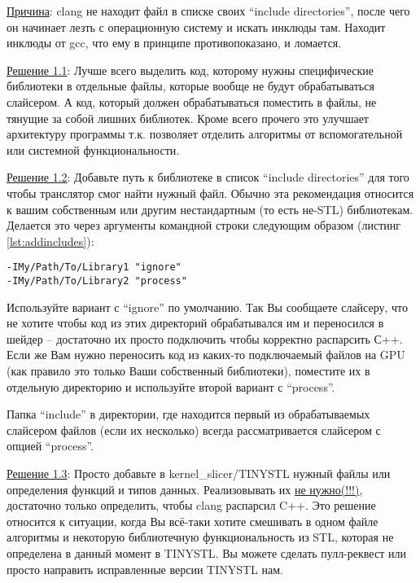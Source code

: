 \documentclass[11pt,fleqn,english,russian]{report} %
\begin{document}
\noindent\underline{Причина}: clang не находит файл в списке своих ``include directories'', после чего он начинает лезть с операционную систему и искать инклюды там. Находит инклюды от gcc, что ему в принципе противопоказано, и ломается. 

\vspace*{5px}
\noindent\underline{Решение 1.1}: Лучше всего выделить код, которому нужны специфические библиотеки в отдельные файлы, которые вообще не будут обрабатываться слайсером. А код, который должен обрабатываться поместить в файлы, не тянущие за собой лишних библиотек. Кроме всего прочего это улучшает архитектуру программы т.к. позволяет отделить алгоритмы от вспомогательной или системной функциональности.

\vspace*{5px}
\noindent\underline{Решение 1.2}: Добавьте путь к библиотеке в список ``include directories'' для того чтобы транслятор смог найти нужный файл. Обычно эта рекомендация относится к вашим собственным или другим нестандартным (то есть не-STL) библиотекам. Делается это через аргументы командной строки следующим образом (листинг \ref{lst:addincludes}):

\begin{lstlisting}[caption=добавляем новый подключаемый файл, 
	label=lst:addincludes]	
-IMy/Path/To/Library1 "ignore"
-IMy/Path/To/Library2 "process"
\end{lstlisting}

Используйте вариант с ``ignore'' по умолчанию. Так Вы сообщаете слайсеру, что не хотите чтобы код из этих директорий обрабатывался им и переносился в шейдер -- достаточно их просто подключить чтобы корректно распарсить С++. Если же Вам нужно переносить код из каких-то подключаемый файлов на GPU (как правило это только Ваши собственный библиотеки), поместите их в отдельную директорию и используйте второй вариант с ``process''.

\begin{remark}
Папка ``include'' в директории, где находится первый из обрабатываемых слайсером файлов (если их несколько) всегда рассматривается слайсером с опцией ``process''.
\end{remark}

\vspace*{5px}
\noindent\underline{Решение 1.3}: Просто добавьте в kernel\_slicer/TINYSTL нужный файлы или определения функций и типов данных. Реализовывать их \underline{не нужно(!!!)}, достаточно только определить, чтобы clang распарсил C++. Это решение относится к ситуации, когда Вы всё-таки хотите смешивать в одном файле алгоритмы и некоторую библиотечную функциональность из STL, которая не определена в данный момент в TINYSTL. Вы можете сделать пулл-реквест или просто направить исправленные версии TINYSTL нам.
\end{document}
